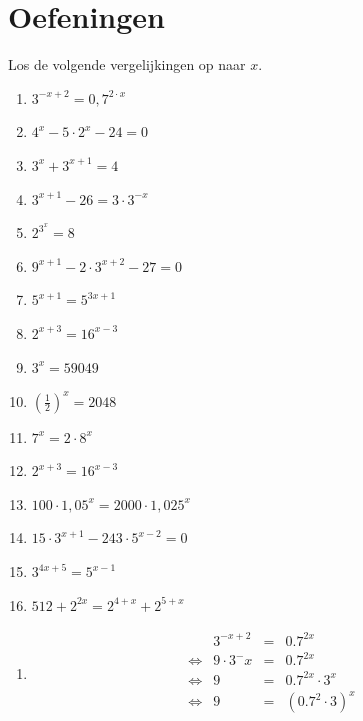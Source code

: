 %
%

\section{Oefeningen}
\begin{oef}     
Los de volgende vergelijkingen op naar $x$. 
\begin{multicols}{2}
\begin{enumerate}
  \item $3^{-x+2}=0,7^{2\cdot x}$
  \item $4^{x}-5\cdot 2^{x}-24=0$
  \item $3^{x}+3^{x+1}=4$
  \item $3^{x+1}-26=3\cdot 3^{-x}$
  \item $2^{3^x}=8$
  \item $9^{x+1}-2\cdot 3^{x+2}-27=0$
  \item $5^{x+1}=5^{3x+1}$
  \item $2^{x+3}=16^{x-3}$
  \item $3^x=59049$
  \item $\left(\frac12\right)^x=2048$
  \item $7^x=2\cdot 8^x$
  \item $2^{x+3}=16^{x-3}$
  \item $100 \cdot 1,05^x=2000\cdot 1,025^x$
  \item $15\cdot 3^{x+1}-243\cdot 5^{x-2}=0$
  \item $3^{4x+5}=5^{x-1}$
  \item $512 + 2^{2x} = 2^{4+x}+2^{5+x}$
\end{enumerate}
\end{multicols}
\begin{opl}
\begin{enumerate}
  \item \[
          \begin{array}{rrclcl}
                 & 3^{-x+2} & = & 0.7^{2x} \\
            \iff & 9 \cdot 3^-x & = & 0.7^{2x} \\
            \iff & 9 & = & 0.7^{2x} \cdot 3^x \\
            \iff & 9 & = & (0.7^2 \cdot 3)^x \\

\end{array}\]
\end{enumerate}
\end{opl}
\end{oef}
